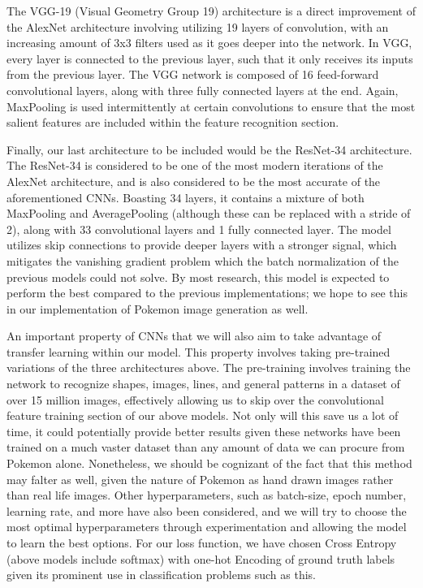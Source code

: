 \documentclass{article} %
\begin{document}
The VGG-19 (Visual Geometry Group 19) architecture is a direct improvement of the AlexNet architecture involving utilizing 19 layers of convolution, with an increasing amount of 3x3 filters used as it goes deeper into the network. In VGG, every layer is connected to the previous layer, such that it only receives its inputs from the previous layer. The VGG network is composed of 16 feed-forward convolutional layers, along with three fully connected layers at the end. Again, MaxPooling is used intermittently at certain convolutions to ensure that the most salient features are included within the feature recognition section. 

Finally, our last architecture to be included would be the ResNet-34 architecture. The ResNet-34 is considered to be one of the most modern iterations of the AlexNet architecture, and is also considered to be the most accurate of the aforementioned CNNs. Boasting 34 layers, it contains a mixture of both MaxPooling and AveragePooling (although these can be replaced with a stride of 2), along with 33 convolutional layers and 1 fully connected layer. The model utilizes skip connections to provide deeper layers with a stronger signal, which mitigates the vanishing gradient problem which the batch normalization of the previous models could not solve. By most research, this model is expected to perform the best compared to the previous implementations; we hope to see this in our implementation of Pokemon image generation as well. 

An important property of CNNs that we will also aim to take advantage of transfer learning within our model. This property involves taking pre-trained variations of the three architectures above. The pre-training involves training the network to recognize shapes, images, lines, and general patterns in a dataset of over 15 million images, effectively allowing us to skip over the convolutional feature training section of our above models. Not only will this save us a lot of time, it could potentially provide better results given these networks have been trained on a much vaster dataset than any amount of data we can procure from Pokemon alone. Nonetheless, we should be cognizant of the fact that this method may falter as well, given the nature of Pokemon as hand drawn images rather than real life images. Other hyperparameters, such as batch-size, epoch number, learning rate, and more have also been considered, and we will try to choose the most optimal hyperparameters through experimentation and allowing the model to learn the best options. For our loss function, we have chosen Cross Entropy (above models include softmax) with one-hot Encoding of ground truth labels given its prominent use in classification problems such as this.
\end{document}
